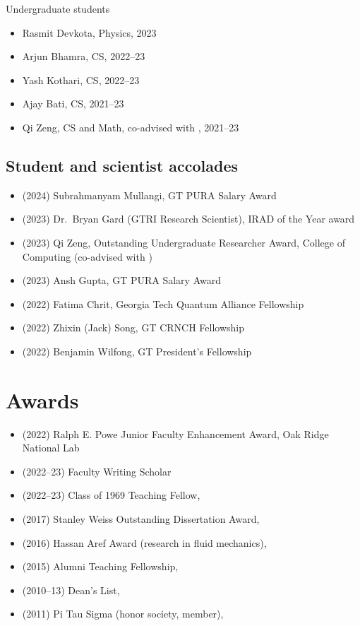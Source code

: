 Undergraduate students
\begin{itemize}
    \item Rasmit Devkota, Physics, 2023
    \item Arjun Bhamra, CS, 2022--23
    \item Yash Kothari, CS, 2022--23
    \item Ajay Bati, CS, 2021--23
    \item Qi Zeng, CS and Math, co-advised with \Florian, 2021--23
\end{itemize}

\subsection{Student and scientist accolades}

\begin{itemize}
    \item (2024) Subrahmanyam Mullangi, GT PURA Salary Award
    \item (2023) Dr.\ Bryan Gard (GTRI Research Scientist), IRAD of the Year award
    \item (2023) Qi Zeng, Outstanding Undergraduate Researcher Award, College of Computing (co-advised with \Florian)
    \item (2023) Ansh Gupta, GT PURA Salary Award
    \item (2022) Fatima Chrit, Georgia Tech Quantum Alliance Fellowship
    \item (2022) Zhixin (Jack) Song, GT CRNCH Fellowship
    \item (2022) Benjamin Wilfong, GT President's Fellowship
\end{itemize}

\section{Awards}

\begin{itemize}
    \item (2022) Ralph E. Powe Junior Faculty Enhancement Award, Oak Ridge National Lab
    \item (2022--23) \GT Faculty Writing Scholar
    \item (2022--23) Class of 1969 Teaching Fellow, \GIT
    \item (2017) Stanley Weiss Outstanding Dissertation Award, \UIUC
    \item (2016) Hassan Aref Award (research in fluid mechanics), \UIUC
    \item (2015) Alumni Teaching Fellowship, \UIUC
    \item (2010--13) Dean's List, \UMD
    \item (2011) Pi Tau Sigma (honor society, member), \UMD
\end{itemize}

